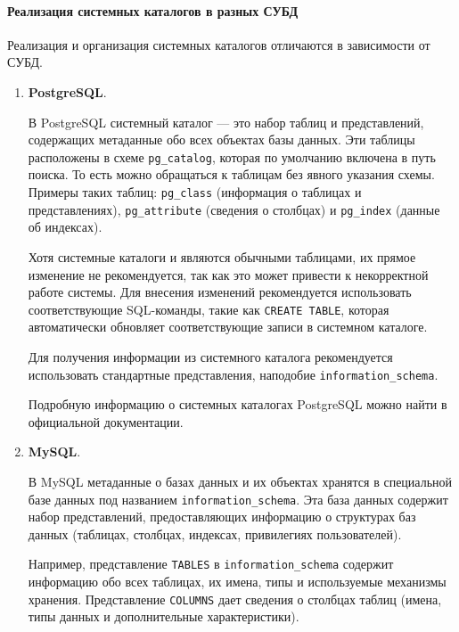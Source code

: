 \paragraph{Реализация системных каталогов в разных СУБД}

Реализация и организация системных каталогов отличаются в зависимости от СУБД.

\begin{enumerate}
    \item \textbf{PostgreSQL}. \autocite{PostgreSQLdocc51,HabrDataOrgp1,YTcoursepostgre}
    
    В PostgreSQL системный каталог — это набор таблиц и представлений, содержащих метаданные обо всех объектах базы данных. Эти таблицы расположены в схеме \texttt{pg\_catalog}, которая по умолчанию включена в путь поиска. То есть можно обращаться к таблицам без явного указания схемы. Примеры таких таблиц: \texttt{pg\_class} (информация о таблицах и представлениях), \texttt{pg\_attribute} (сведения о столбцах) и \texttt{pg\_index} (данные об индексах). \autocite{PostgreSQLdocc51}

    Хотя системные каталоги и являются обычными таблицами, их прямое изменение не рекомендуется, так как это может привести к некорректной работе системы. Для внесения изменений рекомендуется использовать соответствующие SQL-команды, такие как \texttt{CREATE TABLE}, которая автоматически обновляет соответствующие записи в системном каталоге.

    Для получения информации из системного каталога рекомендуется использовать стандартные представления, наподобие \texttt{information\_schema}.

    Подробную информацию о системных каталогах PostgreSQL можно найти в официальной документации. \autocite{PostgreSQLdocc51}

    \item \textbf{MySQL}.
    
    В MySQL метаданные о базах данных и их объектах хранятся в специальной базе данных под названием \texttt{information\_schema}. Эта база данных содержит набор представлений, предоставляющих информацию о структурах баз данных (таблицах, столбцах, индексах, привилегиях пользователей).

    Например, представление \texttt{TABLES} в \texttt{information\_schema} содержит информацию обо всех таблицах, их имена, типы и используемые механизмы хранения. Представление \texttt{COLUMNS} дает сведения о столбцах таблиц (имена, типы данных и дополнительные характеристики).


\end{enumerate}
